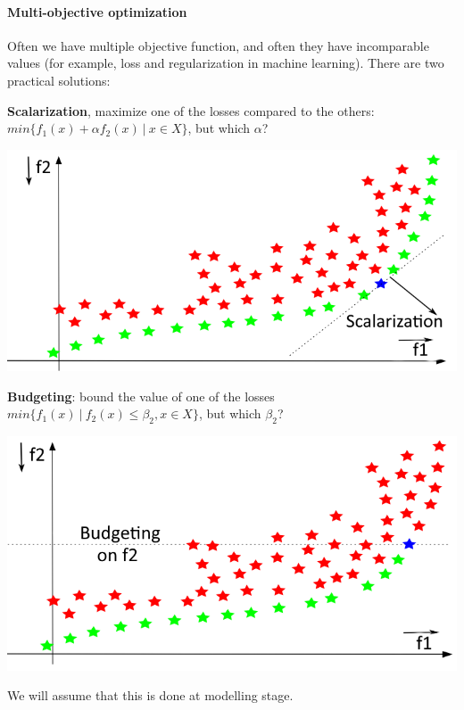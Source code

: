 \documentclass[10pt]{report}
\begin{document}
\paragraph{Multi-objective optimization} Often we have multiple objective function, and often they have incomparable values (for example, loss and regularization in machine learning). There are two practical solutions:
\begin{multicols}{2}
\textbf{Scalarization}, maximize one of the losses compared to the others: 	$min\{f_1(x) + \alpha f_2(x)\:|\:x\in X\}$, but which $\alpha$?
\begin{center}
	\includegraphics[scale=0.33]{3.png}
\end{center}
\columnbreak
\textbf{Budgeting}: bound the value of one of the losses\\
	$min\{f_1(x)\:|\:f_2(x)\leq \beta_2,x\in X\}$, but which $\beta_2$?
\begin{center}
	\includegraphics[scale=0.33]{4.png}
\end{center}
\end{multicols}
We will assume that this is done at modelling stage.
\end{document}
